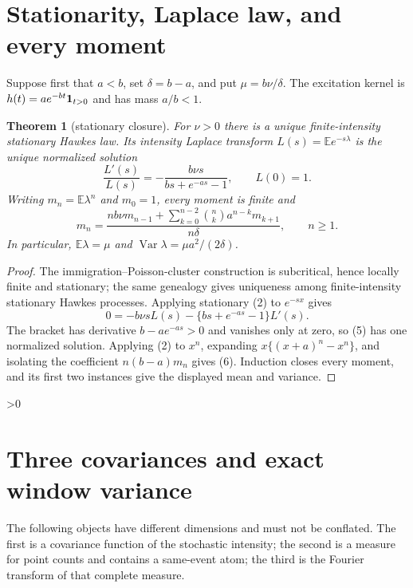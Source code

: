 \documentclass[10pt]{article}
\newtheorem{theorem}{Theorem}
\newcommand{\E}{\mathbb E}
\newcommand{\Var}{\operatorname{Var}}
\begin{document}
\section{Stationarity, Laplace law, and every moment}
Suppose first that $a<b$, set $\delta=b-a$, and put
$\mu=b\nu/\delta$.  The excitation kernel is
$h(t)=ae^{-bt}{\bf1}_{t>0}$ and has mass $a/b<1$.

\begin{theorem}[stationary closure]
For $\nu>0$ there is a unique finite-intensity stationary Hawkes law.  Its
intensity Laplace transform $L(s)=\E e^{-s\lambda}$ is the unique normalized
solution
\begin{equation}
 \frac{L'(s)}{L(s)}=
 -\frac{b\nu s}{bs+e^{-as}-1},\qquad L(0)=1.          \tag{5}
\end{equation}
Writing $m_n=\E\lambda^n$ and $m_0=1$, every moment is finite and
\begin{equation}
 m_n=\frac{nb\nu m_{n-1}+\displaystyle\sum_{k=0}^{n-2}
 \binom{n}{k}a^{n-k}m_{k+1}}{n\delta},\qquad n\geq1. \tag{6}
\end{equation}
In particular, $\E\lambda=\mu$ and
$\Var\lambda=\mu a^2/(2\delta)$.
\end{theorem}
\begin{proof}
The immigration--Poisson-cluster construction is subcritical, hence locally
finite and stationary; the same genealogy gives uniqueness among
finite-intensity stationary Hawkes processes.  Applying stationary (2) to
$e^{-sx}$ gives
\[
 0=-b\nu sL(s)-\{bs+e^{-as}-1\}L'(s).
\]
The bracket has derivative $b-ae^{-as}>0$ and vanishes only at zero, so (5)
has one normalized solution.  Applying (2) to $x^n$, expanding
$x\{(x+a)^n-x^n\}$, and isolating the coefficient
$n(b-a)m_n$ gives (6).  Induction closes every moment, and its first two
instances give the displayed mean and variance.
\end{proof}

\ifnum\HAWKESROUND>0
\section{Three covariances and exact window variance}
The following objects have different dimensions and must not be conflated.
The first is a covariance function of the stochastic intensity; the second
is a measure for point counts and contains a same-event atom; the third is
the Fourier transform of that complete measure.
\end{document}
